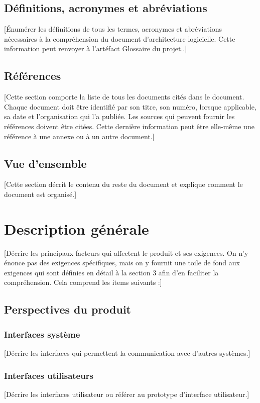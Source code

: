 \documentclass[10pt,a4paper]{report}
\begin{document}
\subsection{Définitions, acronymes et abréviations}
[Énumérer les définitions de tous les termes, acronymes et abréviations nécessaires à la compréhension du document d’architecture logicielle. Cette information peut renvoyer à l’artéfact Glossaire du projet..]

\subsection{Références}
 [Cette section comporte la liste de tous les documents cités dans le document. Chaque document doit être identifié par son titre, son numéro, lorsque applicable, sa date et l’organisation qui l’a publiée. Les sources qui peuvent fournir les références doivent être citées. Cette dernière information peut être elle-même une référence à une annexe ou à un autre document.]
 
\subsection{Vue d’ensemble}
[Cette section décrit le contenu du reste du document  et explique comment le document est organisé.]


\section{Description générale}
[Décrire les principaux facteurs qui affectent le produit et ses exigences. On n’y énonce pas des exigences spécifiques, mais on y fournit une toile de fond aux exigences qui sont définies en détail à la section 3 afin d’en faciliter la compréhension. Cela comprend les items suivants :]

\subsection{Perspectives du produit}

\subsubsection{Interfaces système}
[Décrire les interfaces qui permettent la communication avec d’autres systèmes.]

\subsubsection{Interfaces utilisateurs}
[Décrire les interfaces utilisateur ou référer au prototype d’interface utilisateur.]
\end{document}
